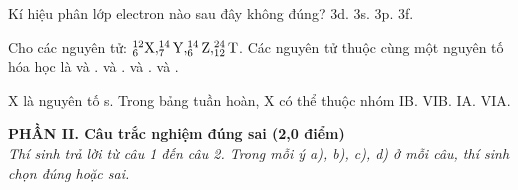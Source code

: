 \documentclass[11pt,a4paper]{article}
\begin{document}
\begin{ex}
Kí hiệu phân lớp electron nào sau đây không đúng?
\choice
{3d.}
{3s.}
{3p.}
{\True 3f.}

\end{ex}
\begin{ex}
Cho các nguyên tử: $^{12}_6\ce{X}, ^{14}_7\ce{Y}, ^{14}_6\ce{Z}, ^{24}_{12}\ce{T}$. Các nguyên tử thuộc cùng một nguyên tố hóa học là
\choice
{ và .}
{\True {} và .}
{ và .}
{ và .}

\end{ex}
\begin{ex}
X là nguyên tố s. Trong bảng tuần hoàn, X có thể thuộc nhóm
\choice
{IB.}
{VIB.}
{\True IA.}
{VIA.}

\end{ex}
\vspace{4pt}
\noindent
{\color{mainGreen}\textbf{\large PHẦN II. Câu trắc nghiệm đúng sai (2,0 điểm)}}\\
\textit{\small Thí sinh trả lời từ câu 1 đến câu 2. Trong mỗi ý a), b), c), d) ở mỗi câu, thí sinh chọn đúng hoặc sai.}
\vspace{2pt}
\end{document}
